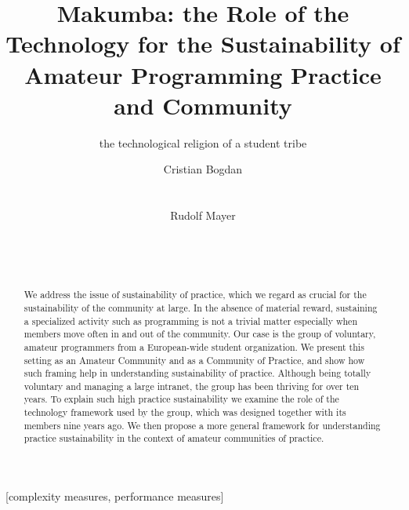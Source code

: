 \documentclass{acm_proc_article-sp}
\begin{document}
\title{Makumba: the Role of the Technology for the Sustainability of Amateur Programming Practice and Community}
\subtitle{the technological religion of a student tribe}

\author{
\alignauthor
Cristian Bogdan\\
       \\
       \\
\alignauthor
Rudolf Mayer\\
       \\
       \\
       \\
}

\maketitle
\begin{abstract}
We address the issue of sustainability of practice, which we regard as crucial for the sustainability of the community at large. In the absence of material reward, sustaining a specialized activity such as programming is not a trivial matter especially when members move often in and out of the community. Our case is the group of voluntary, amateur programmers from a European-wide student organization. We present this setting as an Amateur Community and as a Community of Practice, and show how such framing help in understanding sustainability of practice. Although being totally voluntary and managing a large intranet, the group has been thriving for over ten years. To explain such high practice sustainability we examine the role of the technology framework used by the group, which was designed together with its members nine years ago. We then propose a more general framework for understanding practice sustainability in the context of amateur communities of practice. 
\end{abstract}

[complexity measures, performance measures]
\end{document}
